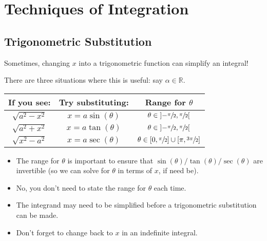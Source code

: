 \chapter{Techniques of Integration}
\section{Trigonometric Substitution}
Sometimes, changing $ x $ into a trigonometric function can
simplify an integral!

There are three situations where this is useful: say $ \alpha\in\mathbb{R} $.

\begin{table}[!htbp]
    \centering
    \begin{tabular}{ccc}
        If you see:        & Try substituting:   & Range for $ \theta $                                                         \\
        \midrule
        $ \sqrt{a^2-x^2} $ & $ x=a\sin(\theta) $ & $ \theta\in\interval[open]{-\sfrac{\pi}{2}}{\sfrac{\pi}{2}} $                \\
        $ \sqrt{a^2+x^2} $ & $ x=a\tan(\theta) $ & $ \theta\in\interval[open]{-\sfrac{\pi}{2}}{\sfrac{\pi}{2}} $                \\
        $ \sqrt{x^2-a^2} $ & $ x=a\sec(\theta) $ & $ \theta\in\interval{0}{\sfrac{\pi}{2}}\cup\interval{\pi}{\sfrac{3\pi}{2}} $
    \end{tabular}
\end{table}

\begin{Remark}{}{}
    \begin{itemize}
        \item The range for $ \theta $ is important to ensure that
              $ \sin(\theta)/\tan(\theta)/\sec(\theta) $ are invertible (so we can
              solve for $ \theta $ in terms of $ x $, if need be).
        \item No, you don't need to state the range for $ \theta $ each time.
        \item The integrand may need to be simplified before a trigonometric substitution
              can be made.
        \item Don't forget to change back to $ x $ in an indefinite integral.
    \end{itemize}
\end{Remark}


